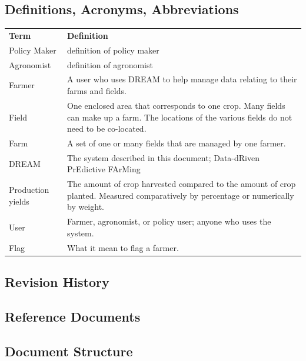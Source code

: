 \subsection{Definitions, Acronyms, Abbreviations}


\begin{center}
\renewcommand{\arraystretch}{1.25}
\begin{tabular}{l >{\raggedright\arraybackslash}p{12cm} } \hline
    \textbf{Term} & \textbf{Definition}\\ 
	Policy Maker & definition of policy maker \\
	Agronomist & definition of agronomist \\
    Farmer & A user who uses DREAM to help manage data relating to their farms and fields.\\
    Field & One enclosed area that corresponds to one crop. Many fields can make up a farm. The locations of the various fields do not need to be co-located.\\
    Farm & A set of one or many fields that are managed by one farmer.\\
    DREAM & The system described in this document; Data-dRiven PrEdictive FArMing\\
    Production yields & The amount of crop harvested compared to the amount of crop planted. Measured comparatively by percentage or numerically by weight.\\
    User & Farmer, agronomist, or policy user; anyone who uses the system.\\
    Flag & What it mean to flag a farmer.\\
    \hline
\end{tabular}
\end{center}



\subsection{Revision History}
\subsection{Reference Documents}
\subsection{Document Structure}